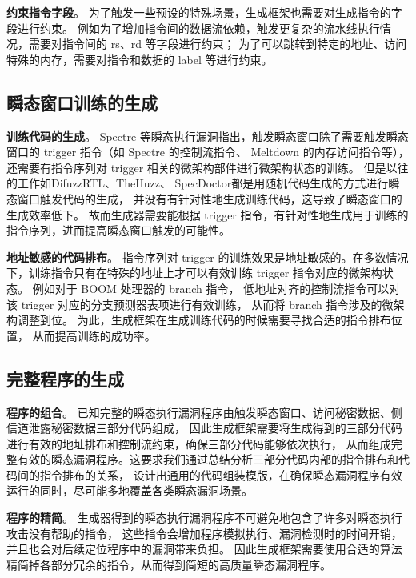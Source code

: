 \textbf{约束指令字段}。
为了触发一些预设的特殊场景，生成框架也需要对生成指令的字段进行约束。
例如为了增加指令间的数据流依赖，触发更复杂的流水线执行情况，需要对指令间的 rs、rd 等字段进行约束；
为了可以跳转到特定的地址、访问特殊的内存，需要对指令和数据的 label 等进行约束。\par

\subsection{瞬态窗口训练的生成}
\textbf{训练代码的生成}。
Spectre 等瞬态执行漏洞指出，触发瞬态窗口除了需要触发瞬态窗口的 trigger 指令（如 Spectre 的控制流指令、
Meltdown 的内存访问指令等），还需要有指令序列对 trigger 相关的微架构部件进行微架构状态的训练。
但是以往的工作如DifuzzRTL\cite{hur2021difuzzrtl}、TheHuzz\cite{kande2022thehuzz}、
SpecDoctor\cite{hur2022specdoctor}都是用随机代码生成的方式进行瞬态窗口触发代码的生成，
并没有有针对性地生成训练代码，这导致了瞬态窗口的生成效率低下。
故而生成器需要能根据 trigger 指令，有针对性地生成用于训练的指令序列，进而提高瞬态窗口触发的可能性。\par

\textbf{地址敏感的代码排布}。
指令序列对 trigger 的训练效果是地址敏感的。在多数情况下，训练指令只有在特殊的地址上才可以有效训练 trigger 指令对应的微架构状态。
例如对于 BOOM 处理器\cite{celio2017boomv2}的 branch 指令，
低地址对齐的控制流指令可以对该 trigger 对应的分支预测器表项进行有效训练，
从而将 branch 指令涉及的微架构调整到位。
为此，生成框架在生成训练代码的时候需要寻找合适的指令排布位置，
从而提高训练的成功率。 \par

\subsection{完整程序的生成}

\textbf{程序的组合}。
已知完整的瞬态执行漏洞程序由触发瞬态窗口、访问秘密数据、侧信道泄露秘密数据三部分代码组成，
因此生成框架需要将生成得到的三部分代码进行有效的地址排布和控制流约束，确保三部分代码能够依次执行，
从而组成完整有效的瞬态漏洞程序。这要求我们通过总结分析三部分代码内部的指令排布和代码间的指令排布的关系，
设计出通用的代码组装模版，在确保瞬态漏洞程序有效运行的同时，尽可能多地覆盖各类瞬态漏洞场景。\par

\textbf{程序的精简}。
生成器得到的瞬态执行漏洞程序不可避免地包含了许多对瞬态执行攻击没有帮助的指令，
这些指令会增加程序模拟执行、漏洞检测时的时间开销，并且也会对后续定位程序中的漏洞带来负担。
因此生成框架需要使用合适的算法精简掉各部分冗余的指令，从而得到简短的高质量瞬态漏洞程序。\par

